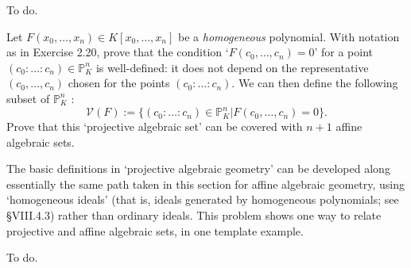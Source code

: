 \documentclass[../../master.tex]{subfiles}
\begin{document}
\begin{solution}
    To do.
\end{solution}

\begin{problem}
    Let $F(x_0, \ldots, x_n) \in K[x_0, \ldots, x_n]$ be a \textit{homogeneous} polynomial.
    With notation as in Exercise 2.20, prove that the condition `$F(c_0, \ldots, c_n) = 0$' for a point $(c_0 : \ldots : c_n) \in \mathbb{P}^{n}_K$ is well-defined:
    it does not depend on the representative $(c_0, \ldots, c_n)$ chosen for the points $(c_0 : \ldots : c_n)$.
    We can then define the following subset of $\mathbb{P}^{n}_K$ :
    \[
        \mathscr{V}(F) := \{(c_0 : \ldots : c_n) \in \mathbb{P}^{n}_K | F(c_0, \ldots, c_n) = 0\}.
    \]
    Prove that this `projective algebraic set' can be covered with $n + 1$ affine algebraic sets.

    The basic definitions in `projective algebraic geometry' can be developed along essentially the same path taken in this section for affine algebraic geometry, using `homogeneous ideals' (that is, ideals generated by homogeneous polynomials; see \S VIII.4.3) rather than ordinary ideals.
    This problem shows one way to relate projective and affine algebraic sets, in one template example.
\end{problem}

\begin{solution}
    To do.
\end{solution}
\end{document}
